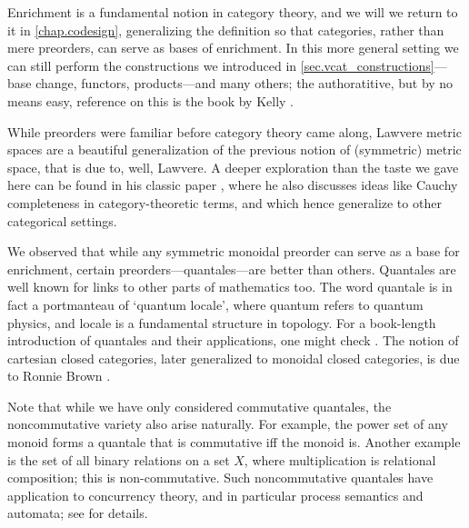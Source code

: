 \documentclass[7Sketches]{subfiles}
\begin{document}
Enrichment is a fundamental notion in category theory, and we will we return to
it in \cref{chap.codesign}, generalizing the definition so that categories,
rather than mere preorders, can serve as bases of enrichment. In this more general
setting we can still perform the constructions we introduced in
\cref{sec.vcat_constructions}---base change, functors, products---and many
others; the authoratitive, but by no means easy, reference on this is the book
by Kelly \cite{Kelly:1982a}.  

While preorders were familiar before category theory came along, Lawvere metric spaces are a
beautiful generalization of the previous notion of (symmetric) metric space, that is due to, well, Lawvere. A deeper exploration than the taste
we gave here can be found in his classic paper \cite{Lawvere:1973a}, where he also discusses ideas like Cauchy completeness in category-theoretic terms, and which hence generalize to other categorical settings.

We observed that while any symmetric monoidal preorder can serve as a base for
enrichment, certain preorders---quantales---are better than others. Quantales are
well known for links to other parts of mathematics too. The word quantale is in
fact a portmanteau of `quantum locale', where quantum refers to quantum physics,
and locale is a fundamental structure in topology. For a book-length
introduction of quantales and their applications, one might check
\cite{Rosenthal:1990a}. %
 The notion of cartesian closed categories, later generalized to monoidal closed categories, is due to Ronnie Brown \cite{brown1961some}. %
%

Note that while we have only considered commutative quantales, the
noncommutative variety also arise naturally. For example, the power set of any
monoid forms a quantale that is commutative iff the monoid is. Another example
is the set of all binary relations on a set $X$, where multiplication is
relational composition; this is non-commutative. Such noncommutative quantales
have application to concurrency theory, and in particular process semantics and
automata; see \cite{Abramsky.Vickers:1993a} for details. 
\end{document}

